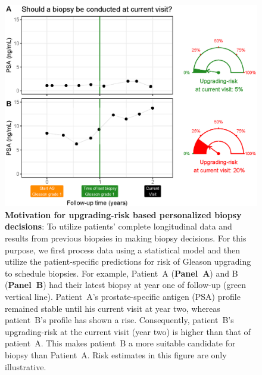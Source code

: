 \begin{figure}
\centerline{\includegraphics[width=\columnwidth]{images/riskBasedExample.eps}}
\caption{\textbf{Motivation for upgrading-risk based personalized biopsy decisions}: To utilize patients' complete longitudinal data and results from previous biopsies in making biopsy decisions. For this purpose, we first process data using a statistical model and then utilize the patient-specific predictions for risk of Gleason upgrading to schedule biopsies. For example, Patient~A (\textbf{Panel~A}) and B (\textbf{Panel~B}) had their latest biopsy at year one of follow-up (green vertical line). Patient~A's prostate-specific antigen (PSA) profile remained stable until his current visit at year two, whereas patient~B's profile has shown a rise. Consequently, patient~B's upgrading-risk at the current visit (year two) is higher than that of patient~A. This makes patient~B a more suitable candidate for biopsy than Patient~A. Risk estimates in this figure are only illustrative.}
\label{fig:riskBasedExample}
\end{figure}

